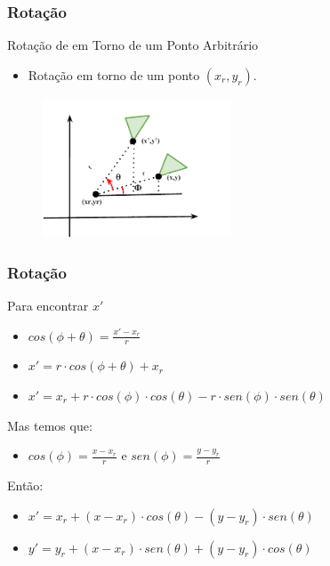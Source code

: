 \documentclass[fleqn]{beamer}
\begin{document}
\begin{frame}
\frametitle{Rotação}


	\begin{block}{Rotação de em Torno de um Ponto Arbitrário}
			\begin{itemize}
				\item Rotação em torno de um ponto $(x_r,y_r)$.
			\end{itemize}
	\end{block}
	
	\begin{figure}[!h]
			\begin{center}
			\includegraphics[width=0.5\textwidth]{Figures/ExemploRotacao3}
			\end{center}
	\end{figure}
	
	
	
\end{frame}


\begin{frame}
\frametitle{Rotação}

	\begin{block}{Para encontrar $x'$}
		\begin{itemize}
			\item $cos (\phi + \theta) = \frac{x' - x_r}{r}$
			\item $x' = r \cdot cos (\phi + \theta) + x_r $	
			\item $x' = x_r + r \cdot cos(\phi) \cdot cos (\theta) - r \cdot sen(\phi) \cdot sen(\theta)$
		\end{itemize}
	\end{block}
	
	\begin{block}{Mas temos que:}
		\begin{itemize}
			\item $cos (\phi) = \frac{x-x_r}{r}$ e $sen(\phi) =\frac{y - y_r}{r}$ 
		\end{itemize}
	\end{block}
	
	\begin{block}{Então:}
		\begin{itemize}
			\item $x' = x_r + (x - x_r) \cdot cos(\theta) - (y-y_r) \cdot sen(\theta)$
			\item $y' = y_r + (x - x_r) \cdot sen(\theta) + (y-y_r) \cdot cos(\theta)$ 
		\end{itemize}
	\end{block}
	
\end{frame}


\end{document}
